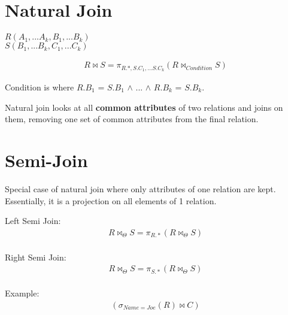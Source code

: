 \documentclass[twoside]{article}
\begin{document}
\section*{Natural Join}
\begin{center}
    $R(A_1,...A_k, B_1,...B_k)$ \\
    $S(B_1,...B_k, C_1,...C_k)$ \\
\end{center}
\begin{gather*}
    R \bowtie S = \pi_{R.*, S.C_1,...S.C_k}(R \bowtie_{Condition} S)
\end{gather*}
\begin{center}
    Condition is where $R.B_1$ = $S.B_1$ $\wedge$ ... $\wedge$ $R.B_k$ = $S.B_k$.
\end{center}
Natural join looks at all \textbf{common attributes} of two relations and joins on
them, removing one set of common attributes from the final relation.

\section*{Semi-Join}
Special case of natural join where only attributes of one relation are kept.
Essentially, it is a projection on all elements of 1 relation.

Left Semi Join:
\begin{gather*}
    R \bowtie_{\Theta} S = \pi_{R.*}(R \bowtie_{\Theta} S) \\
\end{gather*}

Right Semi Join:
\begin{gather*}
    R \bowtie_{\Theta} S = \pi_{S.*}(R \bowtie_{\Theta} S) \\
\end{gather*}

Example:
\begin{gather*}
    (\sigma_{Name=Joe}(R) \bowtie C) \\
\end{gather*}

\newpage
\hfill \break
{}
\end{document}
